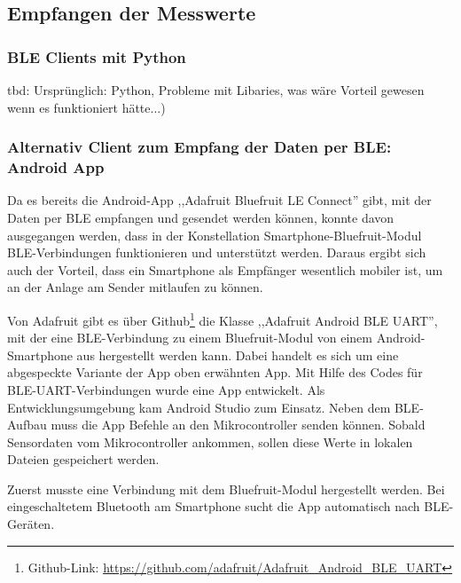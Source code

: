 \subsection{Empfangen der Messwerte}

\subsubsection{BLE Clients mit Python}
tbd: Ursprünglich: Python, Probleme mit Libaries, was wäre Vorteil gewesen wenn es funktioniert hätte...)

\subsubsection{Alternativ Client zum Empfang der Daten per BLE: Android App}
\label{AndroidAppFürDatenmessen}
Da es bereits die Android-App ,,Adafruit Bluefruit LE Connect'' gibt, mit der Daten per BLE empfangen und gesendet werden können, konnte davon ausgegangen werden, dass in der Konstellation Smartphone-Bluefruit-Modul BLE-Verbindungen funktionieren und unterstützt werden. Daraus ergibt sich auch der Vorteil, dass ein Smartphone als Empfänger wesentlich mobiler ist, um an der Anlage am Sender mitlaufen zu können. 

Von Adafruit gibt es über Github\footnote{Github-Link: \url{https://github.com/adafruit/Adafruit_Android_BLE_UART}} die Klasse ,,Adafruit Android BLE UART'', mit der eine BLE-Verbindung zu einem Bluefruit-Modul von einem Android-Smartphone aus hergestellt werden kann. Dabei handelt es sich um eine abgespeckte Variante der App oben erwähnten App. Mit Hilfe des Codes für BLE-UART-Verbindungen wurde eine App entwickelt. Als Entwicklungsumgebung kam Android Studio zum Einsatz. Neben dem BLE-Aufbau muss die App Befehle an den Mikrocontroller senden können. Sobald Sensordaten vom Mikrocontroller ankommen, sollen diese Werte in lokalen Dateien gespeichert werden.

Zuerst musste eine Verbindung mit dem Bluefruit-Modul hergestellt werden. Bei eingeschaltetem Bluetooth am Smartphone sucht die App automatisch nach BLE-Geräten. 

